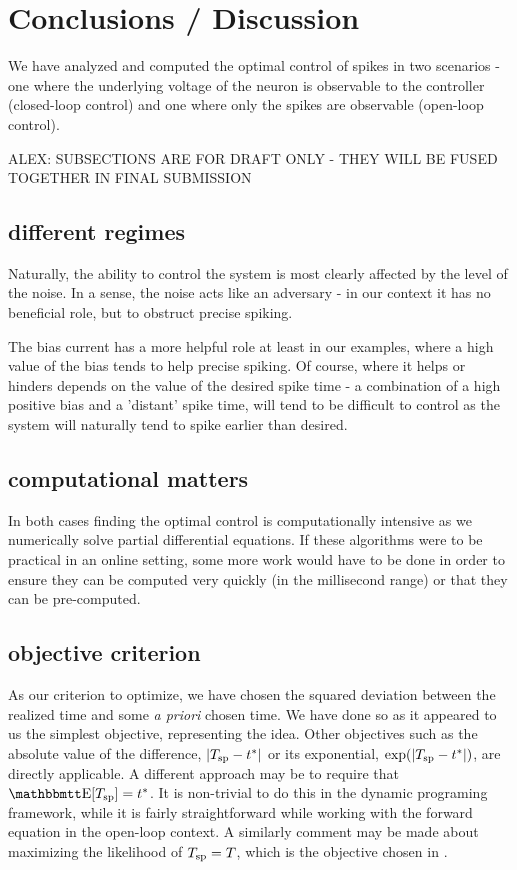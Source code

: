 \documentclass{article}
\begin{document}
\section{Conclusions / Discussion} 
We have analyzed and computed the optimal control of spikes in two scenarios -
one where the underlying voltage of the neuron is observable to the controller
(closed-loop control) and one where only the spikes are observable (open-loop
control). 
 
ALEX: SUBSECTIONS ARE FOR DRAFT ONLY - THEY WILL BE FUSED
TOGETHER IN FINAL SUBMISSION
\subsection{different regimes}
Naturally, the ability to control the system is most clearly affected by the
level of the noise. In a sense, the noise acts like an adversary - in our
context it has no beneficial role, but to obstruct precise spiking.

The bias current has a more helpful role at least in our examples, where a
high value of the bias tends to help precise spiking. Of course, where it helps
or hinders depends on the value of the desired spike time - a combination of a
high positive bias and a 'distant' spike time, will tend to be difficult to
control as the system will naturally tend to spike earlier than desired. 

\subsection{computational matters}
In both cases finding the optimal control is computationally intensive as we
numerically solve partial differential equations. If these algorithms were to be
practical in an online setting, some more work would have to be done in order to
ensure they can be computed very quickly (in the millisecond range) or that
they can be pre-computed.

\subsection{objective criterion}
As our criterion to optimize, we have chosen the squared deviation between the
realized time and some {\sl a priori} chosen time. We have done so as it
appeared to us the simplest objective, representing the idea. Other
objectives such as the absolute value of the difference, $|{ T_{\textrm{sp} } } - { t^* }|$ or its
exponential, $\exp(|{ T_{\textrm{sp} } } - { t^* }|)$, are directly applicable. A different approach
may be to require that $\Exp[\ts] = \T$. It is non-trivial to do this in the
dynamic programing framework, while it is fairly straightforward while working
with the forward equation in the open-loop context. A similarly comment may be
made about maximizing the
likelihood of ${ T_{\textrm{sp} } } = T$, which is the objective chosen in \cite{Ahmadian2011}. 
\end{document}
